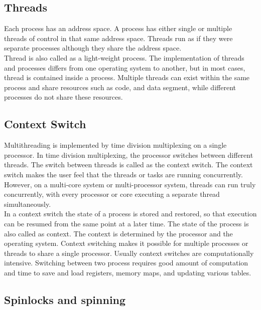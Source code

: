 \subsection{Threads}

Each process has an address space. A process has either single or multiple threads of control in that same address space. Threads run as if they were separate processes although they share the address space. \cite{Galvin}
\\
Thread is also called as a light-weight process. The implementation of threads and processes differs from one operating system to another, but in most cases, thread is contained inside a process. Multiple threads can exist within the same process and share resources such as code, and data segment, while different processes do not share these resources.

\subsection{Context Switch}

Multithreading is implemented by time division multiplexing on a single processor. In time division multiplexing, the processor switches between different threads. The switch between threads is called as the context switch. The context switch makes the user feel that the threads or tasks are running concurrently. However, on a multi-core system or multi-processor system, threads can run truly concurrently, with every processor or core executing a separate thread simultaneously. 
\\
In a context switch the state of a process is stored and restored, so that execution can be resumed from the same point at a later time. The state of the process is also called as context. The context is determined by the processor and the operating system. Context switching makes it possible for multiple processes or threads to share a single processor. Usually context switches are computationally intensive. Switching between two process requires good amount of computation and time to save and load registers, memory maps, and updating various tables.\cite{Galvin} 

\subsection{Spinlocks and spinning}

